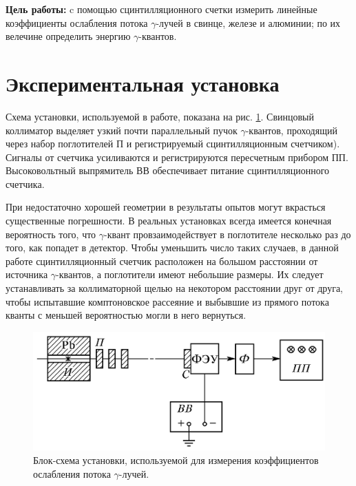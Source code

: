 



	


	\textbf{Цель работы:} c помощью сцинтилляционного счетки измерить линейные коэффициенты ослабления потока $\gamma$-лучей в свинце, железе и алюминии; по их велечине определить энергию $\gamma$-квантов.

	


	\section{Экспериментальная установка}
	Схема установки, используемой в работе, показана на рис. \ref{scheme}. Свинцовый коллиматор выделяет узкий почти параллельный пучок $\gamma$-квантов, проходящий через набор поглотителей П и регистрируемый сцинтилляционным счетчиком). Сигналы от счетчика усиливаются и регистрируются пересчетным прибором ПП. Высоковольтный выпрямитель ВВ обеспечивает питание сцинтилляционного счетчика.

При недостаточно хорошей геометрии в результаты опытов могут
вкрасться существенные погрешности. В реальных установках всегда имеется конечная вероятность того, что $\gamma$-квант провзаимодействует в
поглотителе несколько раз до того, как попадет в детектор. Чтобы уменьшить число таких случаев, в данной работе сцинтилляционный счетчик расположен на большом расстоянии от источника $\gamma$-квантов, а поглотители имеют небольшие
размеры. Их следует устанавливать за коллиматорной щелью на некотором расстоянии друг от друга, чтобы испытавшие комптоновское
рассеяние и выбывшие из прямого потока кванты с меньшей вероятностью могли в него вернуться.
	
	\begin{figure}[h!]
		\centering
		\includegraphics[width=0.8\linewidth]{pics/scheme.png}
		\caption{Блок-схема установки, используемой для измерения коэффициентов ослабления потока $\gamma$-лучей.}
		\label{scheme}
	\end{figure} 


